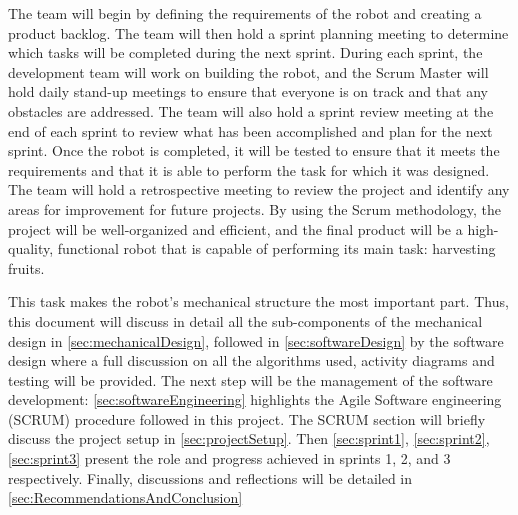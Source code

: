 \noindent The team will begin by defining the requirements of the robot and creating a product backlog. The team will then hold a sprint planning meeting to determine which tasks will be completed during the next sprint. During each sprint, the development team will work on building the robot, and the Scrum Master will hold daily stand-up meetings to ensure that everyone is on track and that any obstacles are addressed. The team will also hold a sprint review meeting at the end of each sprint to review what has been accomplished and plan for the next sprint.
Once the robot is completed, it will be tested to ensure that it meets the requirements and that it is able to perform the task for which it was designed. The team will hold a retrospective meeting to review the project and identify any areas for improvement for future projects.
By using the Scrum methodology, the project will be well-organized and efficient, and the final product will be a high-quality, functional robot that is capable of performing its main task: harvesting fruits.

This task makes the robot’s mechanical structure the most important part. Thus, this document will discuss in detail all the sub-components of the mechanical design in \vref{sec:mechanicalDesign}, followed in \vref{sec:softwareDesign} by the software design where a full discussion on all the algorithms used, activity diagrams and testing will be provided. The next step will be the management of the software development: \vref{sec:softwareEngineering} highlights the Agile Software engineering (SCRUM) procedure followed in this project. The SCRUM section will briefly discuss the project setup in \vref{sec:projectSetup}. Then \cref{sec:sprint1}, \cref{sec:sprint2},\cref{sec:sprint3} present the role and progress achieved in sprints 1, 2, and 3 respectively. Finally, discussions and reflections will be detailed in \vref{sec:RecommendationsAndConclusion} 








